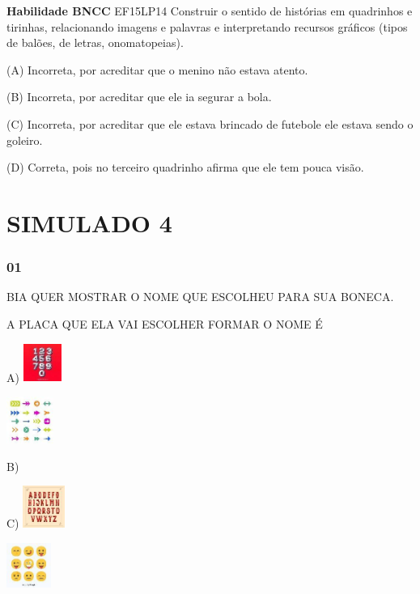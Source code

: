 \textbf{Habilidade BNCC} EF15LP14 Construir o sentido de histórias em
quadrinhos e tirinhas, relacionando imagens e palavras e interpretando
recursos gráficos (tipos de balões, de letras, onomatopeias).

(A) Incorreta, por acreditar que o menino não estava atento.

(B) Incorreta, por acreditar que ele ia segurar a bola.

(C) Incorreta, por acreditar que ele estava brincado de futebole ele
estava sendo o goleiro.

(D) Correta, pois no terceiro quadrinho afirma que ele tem pouca visão.

\section{SIMULADO 4}\label{simulado-4}

\subsubsection{01}\label{section-73}

BIA QUER MOSTRAR O NOME QUE ESCOLHEU PARA SUA BONECA.

A PLACA QUE ELA VAI ESCOLHER FORMAR O NOME É

A)
\includegraphics[width=0.48889in,height=0.48889in]{media/image239.jpg}

\includegraphics[width=0.60625in,height=0.60625in]{media/image240.jpg}

B)

C)
\includegraphics[width=0.54236in,height=0.54236in]{media/image241.jpg}

\includegraphics[width=0.57431in,height=0.57431in]{media/image242.jpg}

